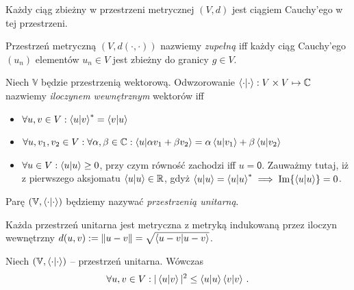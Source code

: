 \documentclass{myclass}
\begin{document}
\begin{theorem}
Każdy ciąg zbieżny w przestrzeni metrycznej \((V,d)\) jest ciągiem Cauchy'ego w tej przestrzeni.
\end{theorem}

\begin{definition}
Przestrzeń metryczną \((V,d(\cdot,\cdot))\) nazwiemy \textit{zupełną} iff każdy ciąg Cauchy'ego
\((u_n)\) elementów \(u_n \in V\) jest zbieżny do granicy \(g \in V\).
\end{definition}

\begin{definition}
Niech \(\mathbb{V}\) będzie przestrzenią wektorową. Odwzorowanie \(\braket{\cdot} : V \times V
\mapsto \mathbb{C}\) nazwiemy \textit{iloczynem wewnętrznym} wektorów iff
\begin{itemize}
    
    \item \(\forall u,v \in V : \braket{u}{v}^* = \braket{v}{u}\)
    
    \item \(\forall u,v_1,v_2 \in V : \forall \alpha, \beta \in \mathbb{C} : \braket{u}{\alpha v_1 +
    \beta v_2} = \alpha \braket{u}{v_1} + \beta \braket{u}{v_2}\)

    \item \(\forall u \in V : \braket{u} \geq 0\), przy czym równość zachodzi iff \(u =
    \mathsf{0}\). Zauważmy tutaj, iż z pierwszego aksjomatu \(\braket{u} \in \mathbb{R}\), gdyż
    \(\braket{u} = \braket{u}^* \implies \Im{\braket{u}} = 0\). 

\end{itemize}
Parę \((\mathbb{V},\braket{\cdot})\) będziemy nazywać \textit{przestrzenią unitarną}.
\end{definition}

\begin{theorem}
Każda przestrzeń unitarna jest metryczna z metryką indukowaną przez iloczyn wewnętrzny \(d(u,v) :=
\norm{u - v} = \sqrt{\braket{u-v}}\).
\end{theorem}

\begin{theorem}
Niech \((\mathbb{V},\braket{\cdot})\) -- przestrzeń unitarna. Wówczas
\begin{equation*}
    \forall u,v \in V : |\braket{u}{v}|^2 \leq \braket{u}\braket{v}\,.
\end{equation*}  
\end{theorem}
\end{document}
